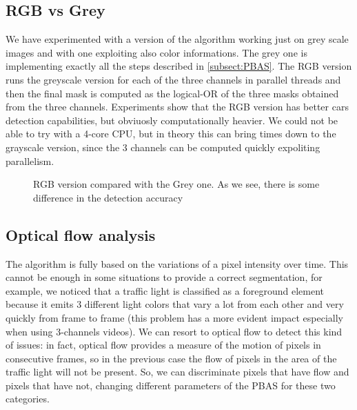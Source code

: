 \subsection*{RGB vs Grey}
We have experimented with a version of the algorithm working just on grey scale images and with one exploiting also color informations. The grey one is implementing exactly all the steps described in \ref{subsect:PBAS}. The RGB version runs the greyscale version for each of the three channels in parallel threads and then the final mask is computed as the logical-OR of the three masks obtained from the three channels.
Experiments show that the RGB version has better cars detection capabilities, but obviuosly computationally heavier. We could not be able to try with a 4-core CPU, but in theory this can bring times down to the grayscale version, since the 3 channels can be computed quickly expoliting parallelism.

\begin{figure}[!t]
    \centering
    \newline
	\caption{RGB version compared with the Grey one. As we see, there is some difference in the detection accuracy}
\end{figure}

\subsection*{Optical flow analysis}
The algorithm is fully based on the variations of a pixel intensity over time. This cannot be enough in some situations to provide a correct segmentation, for example, we noticed that a traffic light is classified as a foreground element because it emits 3 different light colors that vary a lot from each other and very quickly from frame to frame (this problem has a more evident impact especially when using 3-channels videos). We can resort to optical flow to detect this kind of issues: in fact, optical flow provides a measure of the motion of pixels in consecutive frames, so in the previous case the flow of pixels in the area of the traffic light will not be present. So, we can discriminate pixels that have flow and pixels that have not, changing different parameters of the PBAS for these two categories.

